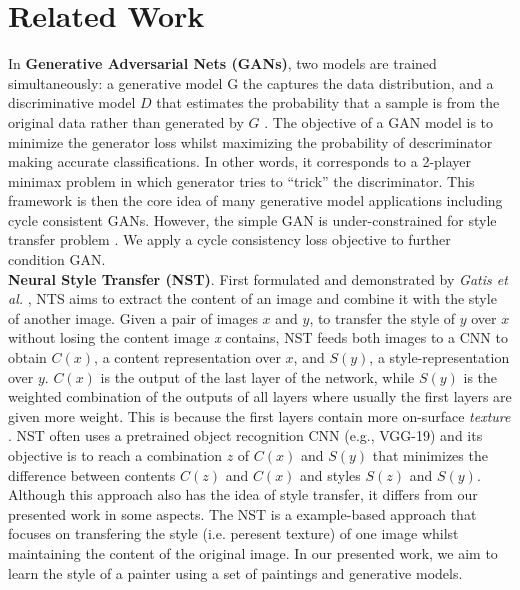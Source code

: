 \documentclass[10pt,twocolumn,letterpaper]{article}
\begin{document}
\section{Related Work}
In \textbf{Generative Adversarial Nets (GANs)}, two models are trained simultaneously: a generative model G the captures the data distribution, and a discriminative model $D$ that estimates the probability that a sample is from the original data rather than generated by $G$ \cite{simplegan}. The objective of a GAN model is to minimize the generator loss whilst maximizing the probability of descriminator making accurate classifications. In other words, it corresponds to a 2-player minimax problem in which generator tries to “trick” the discriminator. This framework is then the core idea of many generative model applications including cycle consistent GANs. However, the simple GAN is under-constrained for style transfer problem \cite{cyclegan}. We apply a cycle consistency loss objective to further condition GAN.  
\\
\textbf{Neural Style Transfer (NST)}. First formulated and demonstrated by \textit{Gatis et al.} \cite{NST}, NTS aims to extract the content of an image and combine it with the style of another image. Given a pair of images $x$ and $y$, to transfer the style of $y$ over $x$ without losing the content image \textit{x} contains, NST feeds both images to a CNN \cite{cnn} to obtain $C(x)$, a content representation over $x$, and $S(y)$, a style-representation over $y$. $C(x)$ is the output of the last layer of the network, while $S(y)$ is the weighted combination of the outputs of all layers where usually the first layers are given more weight. This is because the first layers contain more on-surface \textit{texture} \cite{texture}. NST often uses a pretrained object recognition CNN (e.g., VGG-19) and its objective is to reach a combination $z$ of $C(x)$ and $S(y)$ that minimizes the difference between contents $C(z)$ and $C(x)$ and styles $S(z)$ and $S(y)$. Although this approach also has the idea of style transfer, it differs from our presented work in some aspects. The NST is a example-based approach that focuses on transfering the style (i.e. peresent texture) of one image whilst maintaining the content of the original image. In our presented work, we aim to learn the style of a painter using a set of paintings and generative models. 
\\
\end{document}
